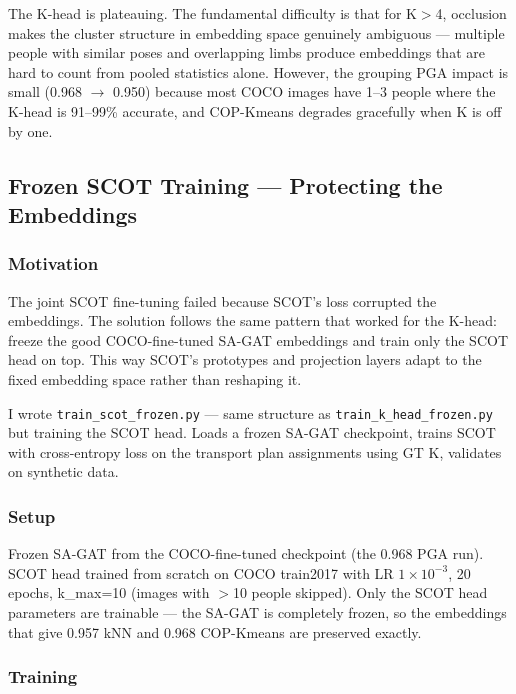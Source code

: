 \vspace{0.5em}

The K-head is plateauing. The fundamental difficulty is that for K$>$4, occlusion makes the cluster structure in embedding space genuinely ambiguous --- multiple people with similar poses and overlapping limbs produce embeddings that are hard to count from pooled statistics alone. However, the grouping PGA impact is small (0.968 $\to$ 0.950) because most COCO images have 1--3 people where the K-head is 91--99\% accurate, and COP-Kmeans degrades gracefully when K is off by one.


\subsection{Frozen SCOT Training --- Protecting the Embeddings}

\subsubsection{Motivation}

The joint SCOT fine-tuning failed because SCOT's loss corrupted the embeddings. The solution follows the same pattern that worked for the K-head: freeze the good COCO-fine-tuned SA-GAT embeddings and train only the SCOT head on top. This way SCOT's prototypes and projection layers adapt to the fixed embedding space rather than reshaping it.

I wrote \texttt{train\_scot\_frozen.py} --- same structure as \texttt{train\_k\_head\_frozen.py} but training the SCOT head. Loads a frozen SA-GAT checkpoint, trains SCOT with cross-entropy loss on the transport plan assignments using GT K, validates on synthetic data.

\subsubsection{Setup}

Frozen SA-GAT from the COCO-fine-tuned checkpoint (the 0.968 PGA run). SCOT head trained from scratch on COCO train2017 with LR $1 \times 10^{-3}$, 20 epochs, k\_max=10 (images with $>$10 people skipped). Only the SCOT head parameters are trainable --- the SA-GAT is completely frozen, so the embeddings that give 0.957 kNN and 0.968 COP-Kmeans are preserved exactly.

\subsubsection{Training}

